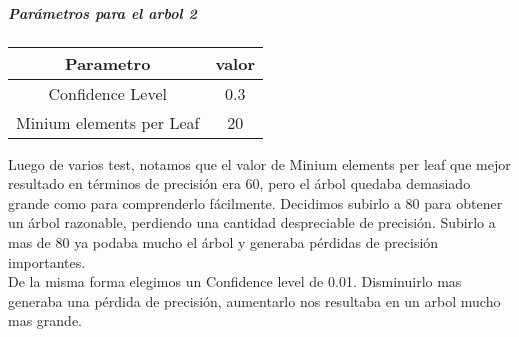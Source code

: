           \subparagraph{Parámetros para el arbol 2}

            \begin{tabular}{||c | c||}
                \hline
                \textbf{Parametro} & \textbf{valor} \\ [0.5ex]
                \hline\hline
                Confidence Level & 0.3 \\
                \hline
                Minium elements per Leaf & 20 \\
                \hline
            \end{tabular}

         \hfill \break
         \hfill \break
          Luego de varios test, notamos que el valor de Minium elements per leaf
          que mejor resultado en términos de precisión era 60, pero el árbol
          quedaba demasiado grande como para comprenderlo fácilmente. Decidimos
          subirlo a 80 para obtener un árbol razonable, perdiendo una cantidad
          despreciable de precisión. Subirlo a mas de 80 ya podaba mucho el
          árbol y generaba pérdidas de precisión importantes.\\
          De la misma forma elegimos un Confidence level de 0.01. Disminuirlo
          mas generaba una pérdida de precisión, aumentarlo nos resultaba en un
          arbol mucho mas grande.

